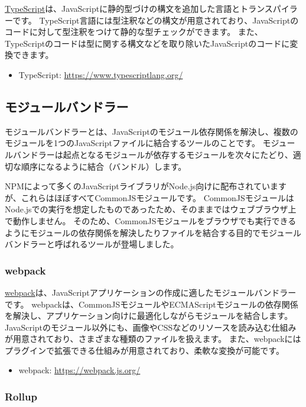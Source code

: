 \href{https://www.typescriptlang.org/}{TypeScript}は、JavaScriptに静的型づけの構文を追加した言語とトランスパイラーです。
TypeScript言語には型注釈などの構文が用意されており、JavaScriptのコードに対して型注釈をつけて静的な型チェックができます。
また、TypeScriptのコードは型に関する構文などを取り除いたJavaScriptのコードに変換できます。\enlargethispage{\baselineskip}
\begin{itemize}
\item TypeScript: \url{https://www.typescriptlang.org/}
\end{itemize}

\hypertarget{module-bundler}{%
\subsection{モジュールバンドラー}\label{module-bundler}}

モジュールバンドラーとは、JavaScriptのモジュール依存関係を解決し、複数のモジュールを1つのJavaScriptファイルに結合するツールのことです。
モジュールバンドラーは起点となるモジュールが依存するモジュールを次々にたどり、適切な順序になるように結合（バンドル）します。

NPMによって多くのJavaScriptライブラリがNode.js向けに配布されていますが、これらはほぼすべてCommonJSモジュールです。
CommonJSモジュールはNode.jsでの実行を想定したものであったため、そのままではウェブブラウザ上で動作しません。
そのため、CommonJSモジュールをブラウザでも実行できるようにモジュールの依存関係を解決したりファイルを結合する目的でモジュールバンドラーと呼ばれるツールが登場しました。

\hypertarget{webpack}{%
\subsubsection{webpack}\label{webpack}}

\href{https://webpack.js.org/}{webpack}は、JavaScriptアプリケーションの作成に適したモジュールバンドラーです。
webpackは、CommonJSモジュールやECMAScriptモジュールの依存関係を解決し、アプリケーション向けに最適化しながらモジュールを結合します。
JavaScriptのモジュール以外にも、画像やCSSなどのリソースを読み込む仕組みが用意されており、さまざまな種類のファイルを扱えます。
また、webpackにはプラグインで拡張できる仕組みが用意されており、柔軟な変換が可能です。
\begin{itemize}
\item webpack: \url{https://webpack.js.org/}
\end{itemize}

\hypertarget{rollup}{%
\subsubsection{Rollup}\label{rollup}}

